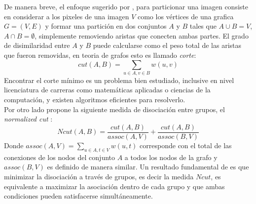 \documentclass[conference]{IEEEtran}
\begin{document}
De manera breve, el enfoque sugerido por \cite{Ncut}, para particionar una imagen consiste en considerar a los pixeles de una imagen $V$ como los vértices de una grafica $G=(V,E)$ y formar una partición en dos conjuntos $A$ y $B$ tales que $A \cup B = V$, $A \cap B = \emptyset $, simplemente removiendo aristas que conecten ambas partes. El grado de disimilaridad entre $A$ y $B$ puede calcularse como el peso total de las aristas que fueron removidas, en teoria de grafos esto es llamado \textit{corte}:
\[
cut(A,B) = \sum_{u\in A, v\in B} w(u,v)
\]
Encontrar el corte mínimo es un problema bien estudiado, inclusive en nivel licenciatura de carreras como matemáticas aplicadas o ciencias de la computación, y existen algoritmos eficientes para resolverlo. \\
Por otro lado \cite{Ncut} propone la siguiente medida de disociación entre grupos, el \textit{normalized cut} :
\[
Ncut(A,B)= \frac{cut(A,B)}{assoc(A,V)}+\frac{cut(A,B)}{assoc(B,V)}
\]
Donde $assoc(A, V) = \sum_{u\in A,t\in V}w(u,t)$ corresponde con el total de las conexiones de los nodos del conjunto $A$ a todos los nodos de la grafo y $assoc(B,V)$ es definido de manera similar. Un resultado fundamental de \cite{Ncut} es que minimizar la disociación a través de grupos, es decir la medida $Ncut$, es equivalente a maximizar la asociación dentro de cada grupo y que ambas condiciones pueden satisfacerse simultáneamente.   
\end{document}
